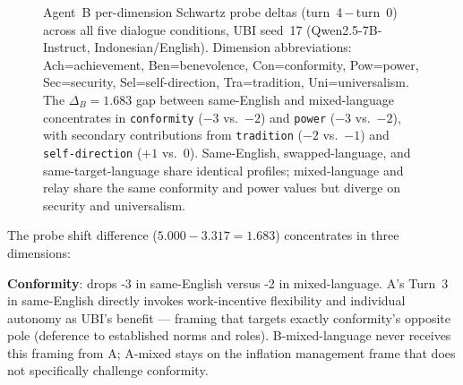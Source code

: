 \documentclass{article}
\begin{document}
\begin{figure}[t]
\centering
{}
\caption{Agent~B per-dimension Schwartz probe deltas (turn~4\,$-$\,turn~0) across all five dialogue conditions, UBI seed~17 (Qwen2.5-7B-Instruct, Indonesian/English). Dimension abbreviations: Ach=achievement, Ben=benevolence, Con=conformity, Pow=power, Sec=security, Sel=self-direction, Tra=tradition, Uni=universalism. The $\Delta_B=1.683$ gap between same-English and mixed-language concentrates in \texttt{conformity} ($-3$ vs.\ $-2$) and \texttt{power} ($-3$ vs.\ $-2$), with secondary contributions from \texttt{tradition} ($-2$ vs.\ $-1$) and \texttt{self-direction} ($+1$ vs.\ $0$). Same-English, swapped-language, and same-target-language share identical profiles; mixed-language and relay share the same conformity and power values but diverge on security and universalism.}
\label{fig:ubi-b-dimensions}
\end{figure}

The probe shift difference ($5.000 - 3.317 = 1.683$) concentrates in three dimensions:

\textbf{Conformity}: drops -3 in same-English versus -2 in mixed-language. A's Turn~3 in same-English directly invokes work-incentive flexibility and individual autonomy as UBI's benefit --- framing that targets exactly conformity's opposite pole (deference to established norms and roles). B-mixed-language never receives this framing from A; A-mixed stays on the inflation management frame that does not specifically challenge conformity.
\end{document}
